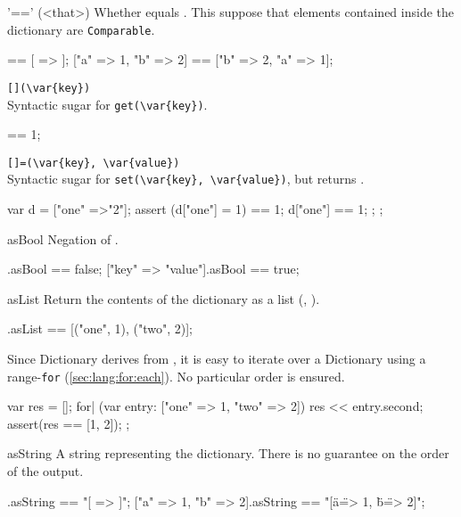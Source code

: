 \begin{urbiscriptapi}
\item['=='](<that>)%
  Whether \this equals .  This suppose that elements
  contained inside the dictionary are \lstinline|Comparable|.
\begin{urbiassert}
[ => ] == [ => ];
["a" => 1, "b" => 2] == ["b" => 2, "a" => 1];
\end{urbiassert}


\item \lstinline|[](\var{key})|\\
  Syntactic sugar for \lstinline|get(\var{key})|.

\begin{urbiassert}
["one" => 1]["one"] == 1;
\end{urbiassert}


\item \lstinline|[]=(\var{key}, \var{value})|\\
  Syntactic sugar for \lstinline|set(\var{key}, \var{value})|, but
  returns .

\begin{urbiscript}
{
  var d = ["one" =>"2"];
  assert
  {
    (d["one"] = 1) == 1;
    d["one"] == 1;
  };
};
\end{urbiscript}


\item[asBool]
  Negation of .
\begin{urbiassert}
[=>].asBool == false;
["key" => "value"].asBool == true;
\end{urbiassert}


\item[asList]
  Return the contents of the dictionary as a  list
  (, ).

\begin{urbiassert}
["one" => 1, "two" => 2].asList == [("one", 1), ("two", 2)];
\end{urbiassert}

  \noindent
  Since Dictionary derives from , it is easy
  to iterate over a Dictionary using a range-\lstinline|for|
  (\autoref{sec:lang:for:each}).  No particular order is ensured.
\begin{urbiscript}
{
  var res = [];
  for| (var entry: ["one" => 1, "two" => 2])
    res << entry.second;
  assert(res == [1, 2]);
};
\end{urbiscript}


\item[asString] A string representing the dictionary.  There is no guarantee
  on the order of the output.
\begin{urbiassert}
                [=>].asString == "[ => ]";
["a" => 1, "b" => 2].asString == "[\"a\" => 1, \"b\" => 2]";
\end{urbiassert}



\end{urbiscriptapi}
